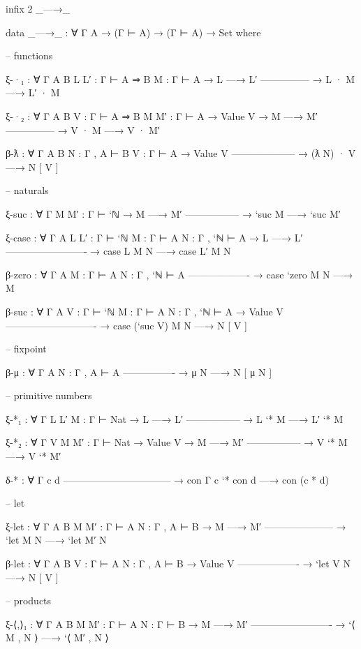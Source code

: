 \begin{fence}
\begin{code}
infix 2 _—→_

data _—→_ : ∀ {Γ A} → (Γ ⊢ A) → (Γ ⊢ A) → Set where

  -- functions

  ξ-·₁ : ∀ {Γ A B} {L L′ : Γ ⊢ A ⇒ B} {M : Γ ⊢ A}
    → L —→ L′
      ---------------
    → L · M —→ L′ · M

  ξ-·₂ : ∀ {Γ A B} {V : Γ ⊢ A ⇒ B} {M M′ : Γ ⊢ A}
    → Value V
    → M —→ M′
      ---------------
    → V · M —→ V · M′

  β-ƛ : ∀ {Γ A B} {N : Γ , A ⊢ B} {V : Γ ⊢ A}
    → Value V
      --------------------
    → (ƛ N) · V —→ N [ V ]

  -- naturals

  ξ-suc : ∀ {Γ} {M M′ : Γ ⊢ `ℕ}
    → M —→ M′
      -----------------
    → `suc M —→ `suc M′

  ξ-case : ∀ {Γ A} {L L′ : Γ ⊢ `ℕ} {M : Γ ⊢ A} {N : Γ , `ℕ ⊢ A}
    → L —→ L′
      -------------------------
    → case L M N —→ case L′ M N

  β-zero :  ∀ {Γ A} {M : Γ ⊢ A} {N : Γ , `ℕ ⊢ A}
      -------------------
    → case `zero M N —→ M

  β-suc : ∀ {Γ A} {V : Γ ⊢ `ℕ} {M : Γ ⊢ A} {N : Γ , `ℕ ⊢ A}
    → Value V
      ----------------------------
    → case (`suc V) M N —→ N [ V ]

  -- fixpoint

  β-μ : ∀ {Γ A} {N : Γ , A ⊢ A}
      ----------------
    → μ N —→ N [ μ N ]

  -- primitive numbers

  ξ-*₁ : ∀ {Γ} {L L′ M : Γ ⊢ Nat}
    → L —→ L′
      -----------------
    → L `* M —→ L′ `* M

  ξ-*₂ : ∀ {Γ} {V M M′ : Γ ⊢ Nat}
    → Value V
    → M —→ M′
      -----------------
    → V `* M —→ V `* M′

  δ-* : ∀ {Γ c d}
      ---------------------------------
    → con {Γ} c `* con d —→ con (c * d)

  -- let

  ξ-let : ∀ {Γ A B} {M M′ : Γ ⊢ A} {N : Γ , A ⊢ B}
    → M —→ M′
      ---------------------
    → `let M N —→ `let M′ N

  β-let : ∀ {Γ A B} {V : Γ ⊢ A} {N : Γ , A ⊢ B}
    → Value V
      -------------------
    → `let V N —→ N [ V ]

  -- products

  ξ-⟨,⟩₁ : ∀ {Γ A B} {M M′ : Γ ⊢ A} {N : Γ ⊢ B}
    → M —→ M′
      -------------------------
    → `⟨ M , N ⟩ —→ `⟨ M′ , N ⟩


\end{code}
\end{fence}
